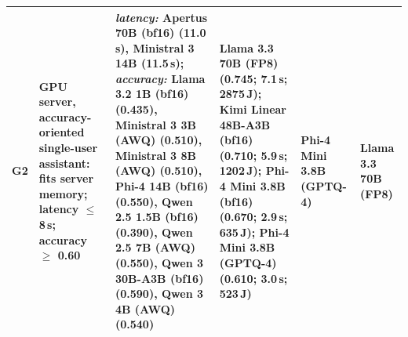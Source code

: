 \begin{table}[!t]
\begin{tabularx}{\textwidth}{@{}P{0.9cm} P{3.0cm} L L P{2.3cm} P{2.3cm}@{}}
G2 & GPU server, accuracy-oriented single-user assistant: fits server memory; latency $\le$ 8\,s; accuracy $\ge$ 0.60 & \emph{latency:} Apertus 70B (bf16) (11.0\,s), Ministral 3 14B (11.5\,s); \emph{accuracy:} Llama 3.2 1B (bf16) (0.435), Ministral 3 3B (AWQ) (0.510), Ministral 3 8B (AWQ) (0.510), Phi-4 14B (bf16) (0.550), Qwen 2.5 1.5B (bf16) (0.390), Qwen 2.5 7B (AWQ) (0.550), Qwen 3 30B-A3B (bf16) (0.590), Qwen 3 4B (AWQ) (0.540) & Llama 3.3 70B (FP8) (0.745; 7.1\,s; 2875\,J); Kimi Linear 48B-A3B (bf16) (0.710; 5.9\,s; 1202\,J); Phi-4 Mini 3.8B (bf16) (0.670; 2.9\,s; 635\,J); Phi-4 Mini 3.8B (GPTQ-4) (0.610; 3.0\,s; 523\,J) & \textbf{Phi-4 Mini 3.8B (GPTQ-4)} & Llama 3.3 70B (FP8) \\
\bottomrule
\end{tabularx}
\end{table}
